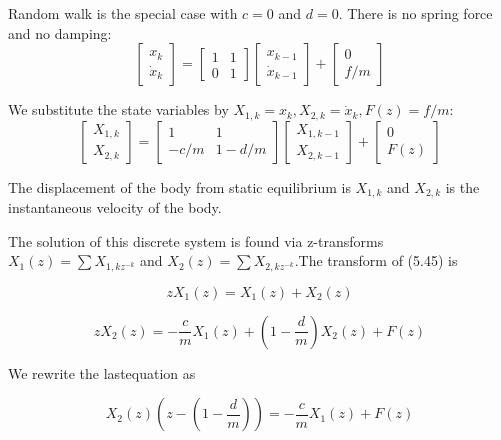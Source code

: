    
   Random walk is the special case with $ c = 0 $ and $ d = 0 $. There is no spring force and no damping:
   \begin{equation}\label{5.44}
   \begin{bmatrix}
   x_{k}\\\dot{x}_{k}
   \end{bmatrix} = \begin{bmatrix}
   1&1\\0&1
   \end{bmatrix} \begin{bmatrix}
   x_{k-1}\\\dot{x}_{k-1}
   \end{bmatrix}+\begin{bmatrix}
   0\\f/m
   \end{bmatrix} 
   \end{equation}
    
   
   We substitute the state variables by $ X_{1,k}=x_{k},X_{2,k}=\dot{x}_{k},F(z)=f/m $:
   \begin{equation}\label{5.45}
   \begin{bmatrix}
   X_{1,k}\\X_{2,k}
   \end{bmatrix} = \begin{bmatrix}
   1&1\\-c/m&1-d/m
   \end{bmatrix} \begin{bmatrix}
   X_{1,k-1}\\X_{2,k-1}
   \end{bmatrix}+\begin{bmatrix}
   0\\F(z)
   \end{bmatrix} 
   \end{equation}
    
   
   The displacement of the body from static equilibrium is $ X_{1,k} $ and $ X_{2,k} $ is the instantaneous velocity of the body.
   
   The solution of this discrete system is found via z-transforms $ X_{1}(z)=\sum X_{1,kz^{-k}} $ and $ X_{2}(z)=\sum X_{2,kz^{-k}} $.The transform of (5.45) is
   
   \[ zX_{1}(z)=X_{1}(z)+X_{2}(z) \]
   
   \[ zX_{2}(z)=-\frac{c}{m}X_{1}(z)+(1-\frac{d}{m})X_{2}(z)+F(z) \]
   
   We rewrite the lastequation as 
   
   \[ X_{2}(z)(z-(1-\frac{d}{m}))=- \frac{c}{m} X_{1}(z)+F(z) \]
   
